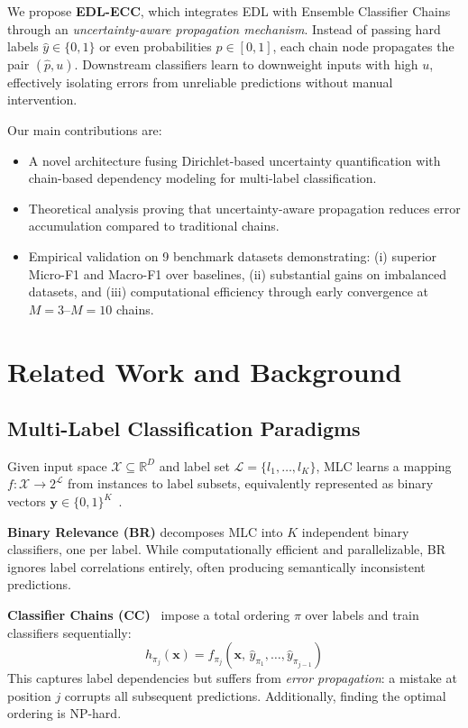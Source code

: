 \documentclass[conference]{IEEEtran}
\begin{document}
We propose \textbf{EDL-ECC}, which integrates EDL with Ensemble Classifier Chains through an \textit{uncertainty-aware propagation mechanism}. Instead of passing hard labels $\hat{y} \in \{0,1\}$ or even probabilities $p \in [0,1]$, each chain node propagates the pair $(\hat{p}, u)$. Downstream classifiers learn to downweight inputs with high $u$, effectively isolating errors from unreliable predictions without manual intervention.

Our main contributions are:
\begin{itemize}
    \item A novel architecture fusing Dirichlet-based uncertainty quantification with chain-based dependency modeling for multi-label classification.
    \item Theoretical analysis proving that uncertainty-aware propagation reduces error accumulation compared to traditional chains.
    \item Empirical validation on 9 benchmark datasets demonstrating: (i) superior Micro-F1 and Macro-F1 over baselines, (ii) substantial gains on imbalanced datasets, and (iii) computational efficiency through early convergence at $M=3$--$M=10$ chains.
\end{itemize}

\section{Related Work and Background}

\subsection{Multi-Label Classification Paradigms}

Given input space $\mathcal{X} \subseteq \mathbb{R}^D$ and label set $\mathcal{L} = \{l_1, \ldots, l_K\}$, MLC learns a mapping $f: \mathcal{X} \to 2^{\mathcal{L}}$ from instances to label subsets, equivalently represented as binary vectors $\mathbf{y} \in \{0, 1\}^K$~\cite{tsoumakas2007multi,zhang2014review}.

\textbf{Binary Relevance (BR)} decomposes MLC into $K$ independent binary classifiers, one per label. While computationally efficient and parallelizable, BR ignores label correlations entirely, often producing semantically inconsistent predictions.

\textbf{Classifier Chains (CC)}~\cite{read2011classifier} impose a total ordering $\pi$ over labels and train classifiers sequentially:
\begin{equation}
    h_{\pi_j}(\mathbf{x}) = f_{\pi_j}\!\left(\mathbf{x},\, \hat{y}_{\pi_1}, \ldots, \hat{y}_{\pi_{j-1}}\right)
\end{equation}
This captures label dependencies but suffers from \textit{error propagation}: a mistake at position $j$ corrupts all subsequent predictions. Additionally, finding the optimal ordering is NP-hard.
\end{document}
